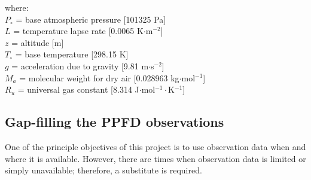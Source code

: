 \noindent where:\\
\indent $P_{\circ}$ = base atmospheric pressure [101325 Pa]\\
\indent $L$ = temperature lapse rate [0.0065 K$\cdot$m$^{-2}$]\\
\indent $z$ = altitude [m]\\
\indent $T_{\circ}$ = base temperature [298.15 K]\\
\indent $g$ = acceleration due to gravity [9.81 m$\cdot$s$^{-2}$]\\
\indent $M_a$ = molecular weight for dry air [0.028963 kg$\cdot$mol$^{-1}$]\\
\indent $R_u$ = universal gas constant [8.314 J$\cdot$mol$^{-1}\cdot$K$^{-1}$]\\


\subsection{Gap-filling the PPFD observations}
\label{sec:mst2gfppfd}
One of the principle objectives of this project is to use observation data when and where it is available.  
However, there are times when observation data is limited or simply unavailable; therefore, a substitute is required. 

